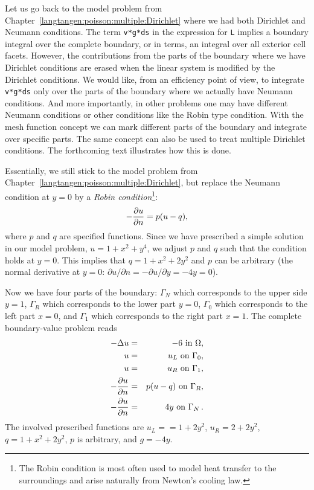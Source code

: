 Let us go back to the model problem from 
Chapter~\ref{langtangen:poisson:multiple:Dirichlet} 
where we had both Dirichlet and Neumann conditions.
The term {\fontsize{12pt}{12pt}\texttt{v*g*ds}} in the expression for {\fontsize{12pt}{12pt}\texttt{L}} implies a
boundary integral over the complete boundary, or in \fenics{} terms,
an integral over all exterior cell facets.
However, the contributions from the parts of the boundary where we have
Dirichlet conditions are erased when the linear system is modified by
the Dirichlet conditions.
We would like, from an efficiency point of view, to integrate {\fontsize{12pt}{12pt}\texttt{v*g*ds}}
only over the parts of the boundary where we actually have Neumann conditions.
And more importantly,
in other problems one may have different Neumann conditions or
other conditions like the Robin type condition. 
With the mesh function concept we can mark
different parts of the boundary and integrate over specific parts.
The same concept can also be used to treat multiple Dirichlet conditions.
The forthcoming text illustrates how this is done.

Essentially, we still stick to the model problem from
Chapter~\ref{langtangen:poisson:multiple:Dirichlet}, but replace the
Neumann condition at $y=0$ by a \emph{Robin condition}\footnote{The Robin condition is
most often used to model heat transfer to the surroundings and arise
naturally from Newton's cooling law.}:
\[ -{\partial u\over\partial n} = p(u-q),\]
where $p$ and $q$ are specified functions. 
Since we have prescribed a simple solution in our model problem,
$u=1+x^2+y^4$, we adjust $p$ and $q$ such that the condition holds
at $y=0$. This implies that $q=1+x^2+2y^2$ and $p$ can be arbitrary 
(the normal derivative at $y=0$: $\partial u/\partial n = -\partial u/\partial y = -4y=0$).

Now we have four parts of the boundary: $\Gamma_N$ which corresponds to
the upper side $y=1$, $\Gamma_R$ which corresponds to the lower part
$y=0$, $\Gamma_0$ which corresponds to the left part $x=0$, and
$\Gamma_1$ which corresponds to the right part $x=1$. The
complete boundary-value problem reads
\begin{eqnarray} 
    - \Delta u &=& -6 \mbox{ in } \Omega, \label{langtangen:poisson:2D:DN3}\\
    u &=& u_L \mbox{ on } \Gamma_0, \label{langtangen:poisson:2D:DN3:bc1}\\
    u &=& u_R \mbox{ on } \Gamma_1, \label{langtangen:poisson:2D:DN3:bc2}\\
    - {\partial u\over\partial n} &=& p(u-q) \mbox{ on } \Gamma_R, 
    \label{langtangen:poisson:2D:DN3:bc3}\\
    - {\partial u\over\partial n} &=& 4y \mbox{ on } \Gamma_N\thinspace .
    \label{langtangen:poisson:2D:DN3:bc4}
\end{eqnarray}
The involved prescribed functions are $u_L== 1 + 2y^2$,
$u_R = 2 + 2y^2$, $q=1+x^2+2y^2$, $p$ is arbitrary, and $g=-4y$.

